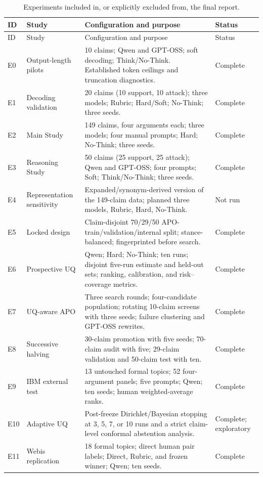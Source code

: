 \documentclass[11pt,twoside,a4paper]{report}
\begin{document}
\begin{longtable}{@{}p{}p{}p{}p{}@{}}
\caption{Experiments included in, or explicitly excluded from, the final report.}
\label{tab:appendix-inventory}\\
\toprule
ID & Study & Configuration and purpose & Status \\
\midrule
\endfirsthead
\toprule
ID & Study & Configuration and purpose & Status \\
\midrule
\endhead
E0 & Output-length pilots & 10 claims; Qwen and GPT-OSS; soft decoding;
Think/No-Think.  Established token ceilings and truncation diagnostics. & Complete \\
E1 & Decoding validation & 20 claims (10 support, 10 attack); three models;
Rubric; Hard/Soft; No-Think; three seeds. & Complete \\
E2 & Main Study & 149 claims, four arguments each; three models; four manual
prompts; Hard; No-Think; three seeds. & Complete \\
E3 & Reasoning Study & 50 claims (25 support, 25 attack); Qwen and GPT-OSS;
four prompts; Soft; Think/No-Think; three seeds. & Complete \\
E4 & Representation sensitivity & Expanded/synonym-derived version of the
149-claim data; planned three models, Rubric, Hard, No-Think. & Not run \\
E5 & Locked design & Claim-disjoint 70/29/50 APO-train/validation/internal
split; stance-balanced; fingerprinted before search. & Complete \\
E6 & Prospective UQ & Qwen; Hard; No-Think; ten runs; disjoint five-run
estimate and held-out sets; ranking, calibration, and risk--coverage metrics. & Complete \\
E7 & UQ-aware APO & Three search rounds; four-candidate population; rotating
10-claim screens with three seeds; failure clustering and GPT-OSS rewrites. & Complete \\
E8 & Successive halving & 30-claim promotion with five seeds; 70-claim audit
with five; 29-claim validation and 50-claim test with ten. & Complete \\
E9 & IBM external test & 13 untouched formal topics; 52 four-argument panels;
five prompts; Qwen; ten seeds; human weighted-average ranks. & Complete \\
E10 & Adaptive UQ & Post-freeze Dirichlet/Bayesian stopping at 3, 5, 7, or 10
runs and a strict claim-level conformal abstention analysis. & Complete; exploratory \\
E11 & Webis replication & 18 formal topics; direct human pair labels; Direct,
Rubric, and frozen winner; Qwen; ten seeds. & Complete \\
\bottomrule
\end{longtable}
\end{document}
